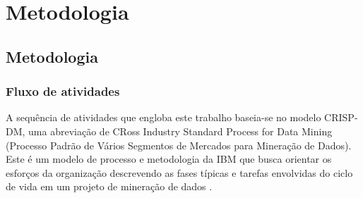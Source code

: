 \part{Metodologia}

\chapter{Metodologia}

\section{Fluxo de atividades}

A sequência de atividades que engloba este trabalho baseia-se no modelo CRISP-DM, uma abreviação de CRoss Industry Standard Process for Data Mining (Processo Padrão de Vários Segmentos de Mercados para Mineração de Dados). Este é um modelo de processo e metodologia da IBM que busca orientar os esforços da organização descrevendo as fases típicas e tarefas envolvidas do ciclo de vida em um projeto de mineração de dados \cite{crispdm}. 